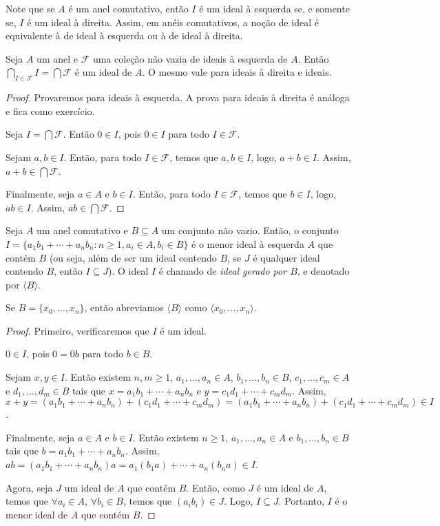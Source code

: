 Note que se $A$ é um anel comutativo, então $I$ é um ideal à esquerda se, e somente se, $I$ é um ideal à direita. Assim, em anéis comutativos, a noção de ideal é equivalente à de ideal à esquerda ou à de ideal à direita.

\begin{prop}
    Seja $A$ um anel e $\mathcal F$ uma coleção não vazia de ideais à esquerda de $A$. Então $\bigcap_{I \in \mathcal F}I=\bigcap \mathcal F$ é um ideal de $A$. O mesmo vale para ideais à direita e ideais.
\end{prop}
\begin{proof}
    Provaremos para ideais à esquerda. A prova para ideais à direita é análoga e fica como exercício.

    Seja $I=\bigcap \mathcal F$. Então $0 \in I$, pois $0 \in I$ para todo $I \in \mathcal F$.

    Sejam $a, b \in I$. Então, para todo $I \in \mathcal F$, temos que $a, b \in I$, logo, $a+b\in I$. Assim, $a+b\in \bigcap \mathcal F$.

    Finalmente, seja $a \in A$ e $b \in I$. Então, para todo $I \in \mathcal F$, temos que $b \in I$, logo, $ab\in I$. Assim, $ab\in \bigcap \mathcal F$.
\end{proof}

\begin{prop}
    Seja $A$ um anel comutativo e $B\subseteq A$ um conjunto não vazio. Então, o conjunto $I=\{a_1b_1+\cdots+a_nb_n: n\geq 1, a_i \in A, b_i \in B\}$ é o menor ideal à esquerda $A$ que contém $B$ (ou seja, além de ser um ideal contendo $B$, se $J$ é qualquer ideal contendo $B$, então $I\subseteq J$). O ideal $I$ é chamado de \emph{ideal gerado por $B$}, e denotado por $\langle B \rangle$.
    
    Se $B=\{x_0, \dots, x_n\}$, então abreviamos $\langle B \rangle$ como $\langle x_0, \dots, x_n \rangle$.
\end{prop}
\begin{proof}
    Primeiro, verificaremos que $I$ é um ideal.

    $0 \in I$, pois $0=0b$ para todo $b \in B$.

    Sejam $x, y \in I$. Então existem $n, m\geq 1$, $a_1, \dots, a_n \in A$, $b_1, \dots, b_n \in B$, $c_1, \dots, c_m \in A$ e $d_1, \dots, d_m \in B$ tais que $x=a_1b_1+\cdots+a_nb_n$ e $y=c_1d_1+\cdots+c_md_m$. Assim, $x+y=(a_1b_1+\cdots+a_nb_n)+(c_1d_1+\cdots+c_md_m)=(a_1b_1+\cdots+a_nb_n)+(c_1d_1+\cdots+c_md_m) \in I$.

    Finalmente, seja $a \in A$ e $b \in I$. Então existem $n\geq 1$, $a_1, \dots, a_n \in A$ e $b_1, \dots, b_n \in B$ tais que $b=a_1b_1+\cdots+a_nb_n$. Assim, $ab=(a_1b_1+\cdots+a_nb_n)a=a_1(b_1a)+\cdots+a_n(b_na) \in I$.

    Agora, seja $J$ um ideal de $A$ que contém $B$. Então, como $J$ é um ideal de $A$, temos que $\forall a_i\in A$, $\forall b_i\in B$, temos que $(a_i b_i)\in J$. Logo, $I\subseteq J$. Portanto, $I$ é o menor ideal de $A$ que contém $B$.
\end{proof}

